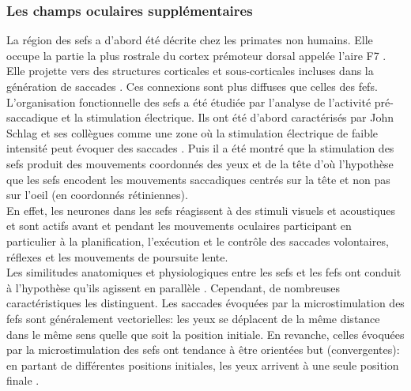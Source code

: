 
\subsubsection{Les champs oculaires supplémentaires}

La région des \glspl{sef} a d'abord été décrite chez les primates non humains. Elle occupe la partie la plus rostrale du cortex prémoteur dorsal appelée l'aire F7 \cite{Matelli:1991}. Elle projette vers des structures corticales et sous-corticales incluses dans la génération de saccades \cite{Huerta:1990, Parthasarathy:1992, Schall:1993, Shook:1990}. Ces connexions sont plus diffuses que celles des \glspl{fef}. L'organisation fonctionnelle des \glspl{sef} a été étudiée par l'analyse de l'activité pré-saccadique et la stimulation électrique. Ils ont été d'abord caractérisés par John Schlag et ses collègues comme une zone où la stimulation électrique de faible intensité peut évoquer des saccades \cite{Schlag:1987}. Puis il a été montré que la stimulation des \glspl{sef} produit des mouvements coordonnés des yeux et de la tête \cite{Martinez:2003} d'o\`u l'hypothèse que les \glspl{sef} encodent les mouvements saccadiques centrés sur la tête et non pas sur l'oeil (en coordonnés rétiniennes).\\

En effet, les neurones dans les \glspl{sef} réagissent à des stimuli visuels et acoustiques et sont actifs avant et pendant les mouvements oculaires \cite{Berdyyeva:2009, Bon:1991, Ohmae:2008, Schlag:1992,Nakamura:2005, Uchida:2007} participant en particulier à la planification, l'exécution et le contrôle  des saccades volontaires, réflexes et les mouvements de poursuite lente.\\ 

Les similitudes anatomiques et physiologiques entre les \glspl{sef} et les \glspl{fef} ont conduit à l'hypothèse qu'ils agissent en parallèle \cite{Amador:2004, Russo:2000, Tehovnik:2000}. Cependant, de nombreuses caractéristiques les distinguent. Les saccades évoquées par la microstimulation des \glspl{fef} sont généralement vectorielles: les yeux se déplacent de la même distance dans le même sens quelle que soit la position initiale. En revanche, celles évoquées par la microstimulation des \glspl{sef} ont tendance à être orientées but (convergentes): en partant de différentes positions initiales, les yeux arrivent à une seule position finale \cite{Martinez:2004, Park:2006}.\\

